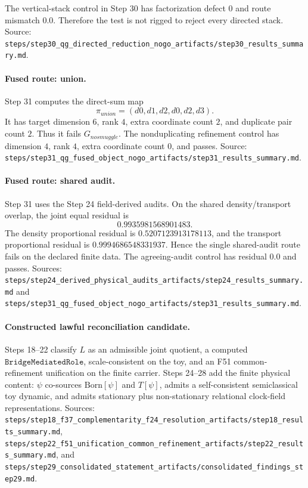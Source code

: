 The vertical-stack control in Step 30 has factorization defect \(0\) and route
mismatch \(0.0\).  Therefore the test is not rigged to reject every directed
stack.  Source:
\texttt{steps/step30\_qg\_directed\_reduction\_nogo\_artifacts/step30\_results\_summary.md}.

\paragraph{Fused route: union.}
Step 31 computes the direct-sum map
\[
\pi_{union}=(d0,d1,d2,d0,d2,d3).
\]
It has target dimension \(6\), rank \(4\), extra coordinate count \(2\), and
duplicate pair count \(2\).  Thus it fails \(G_{nosmuggle}\).  The
nonduplicating refinement control has dimension \(4\), rank \(4\), extra
coordinate count \(0\), and passes.  Source:
\texttt{steps/step31\_qg\_fused\_object\_nogo\_artifacts/step31\_results\_summary.md}.

\paragraph{Fused route: shared audit.}
Step 31 uses the Step 24 field-derived audits.  On the shared
density/transport overlap, the joint equal residual is
\[
0.9935981568901483.
\]
The density proportional residual is \(0.5207123913178113\), and the
transport proportional residual is \(0.9994686548331937\).  Hence the single
shared-audit route fails on the declared finite data.  The agreeing-audit
control has residual \(0.0\) and passes.  Sources:
\texttt{steps/step24\_derived\_physical\_audits\_artifacts/step24\_results\_summary.md}
and
\texttt{steps/step31\_qg\_fused\_object\_nogo\_artifacts/step31\_results\_summary.md}.

\paragraph{Constructed lawful reconciliation candidate.}
Steps 18--22 classify \(L\) as an admissible joint quotient, a computed
\(\texttt{BridgeMediatedRole}\), scale-consistent on the toy, and an F51
common-refinement unification on the finite carrier.  Steps 24--28 add the
finite physical content: \(\psi\) co-sources \(\mathrm{Born}[\psi]\) and
\(T[\psi]\), admits a self-consistent semiclassical toy dynamic, and admits
stationary plus non-stationary relational clock-field representations.
Sources:
\texttt{steps/step18\_f37\_complementarity\_f24\_resolution\_artifacts/step18\_results\_summary.md},
\texttt{steps/step22\_f51\_unification\_common\_refinement\_artifacts/step22\_results\_summary.md},
and
\texttt{steps/step29\_consolidated\_statement\_artifacts/consolidated\_findings\_step29.md}.

